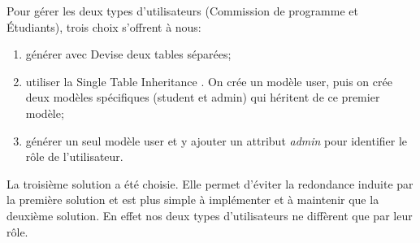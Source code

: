 Pour gérer les deux types d'utilisateurs (Commission de programme et Étudiants), trois choix s'offrent à nous:
\begin{enumerate}
  \item générer avec Devise deux tables séparées;
  \item utiliser la Single Table Inheritance \cite{STI}. On crée un modèle user, puis on crée deux modèles spécifiques (student et admin) qui héritent de ce premier modèle;
  \item générer un seul modèle user et y ajouter un attribut \textit{admin} pour identifier le rôle de l'utilisateur.
\end{enumerate}

La troisième solution a été choisie. Elle permet d'éviter la redondance induite par la première solution et est plus simple à implémenter et à maintenir que la deuxième solution. En effet nos deux types d'utilisateurs ne diffèrent que par leur rôle. 









